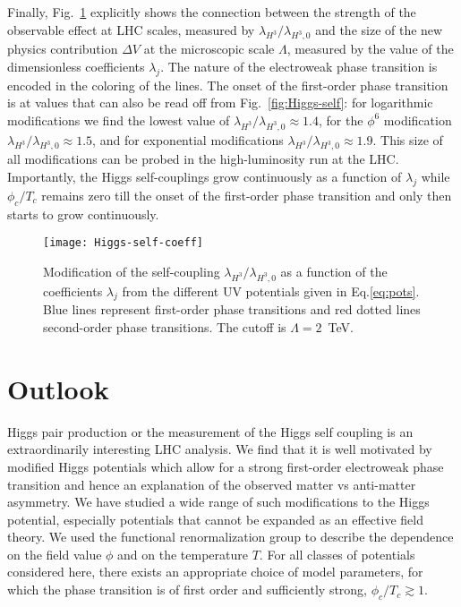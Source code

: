 \documentclass[aps,prd,11pt,tightenlines,superscriptaddress,nofootinbib,preprintnumbers,notitlepage]{revtex4-1}
\begin{document}
Finally, Fig.~\ref{fig:Higgs-self-coeff} explicitly shows the connection
between the strength of the observable effect at LHC scales, measured
by $\lambda_{H^3}/\lambda_{H^3,0}$ and the size of the new physics
contribution $\Delta V$ at the microscopic scale $\Lambda$, measured
by the value of the dimensionless coefficients $\lambda_j$. The nature
of the electroweak phase transition is encoded in the coloring of the lines.
The onset of the first-order phase transition is at values that can 
also be read off from Fig.~\ref{fig:Higgs-self}: for logarithmic modifications
we find the lowest value of $\lambda_{H^3}/\lambda_{H^3,0} \approx 1.4$,
for the $\phi^6$ modification $\lambda_{H^3}/\lambda_{H^3,0} \approx 1.5$,
and for exponential modifications $\lambda_{H^3}/\lambda_{H^3,0} \approx 1.9$.
This size of all modifications can be probed in the high-luminosity run at the LHC.
Importantly, the Higgs self-couplings grow continuously as a function of $\lambda_j$
while $\phi_c/T_c$ remains zero till the onset of the first-order phase transition
and only then starts to grow continuously.

\begin{figure}[!t]
 \texttt{[image: Higgs-self-coeff]}
 \caption{Modification of the self-coupling
   $\lambda_{H^3}/\lambda_{H^3,0}$ as a function of the
   coefficients $\lambda_j$ from the different UV potentials given in
   Eq.\eqref{eq:pots}.  Blue lines represent first-order phase
   transitions and red dotted lines second-order phase transitions. The cutoff
   is $\Lambda = 2$~TeV.}
 \label{fig:Higgs-self-coeff}
\end{figure}



\section{Outlook}
\label{sec:outlook}

Higgs pair production or the measurement of the Higgs self coupling is
an extraordinarily interesting LHC analysis. We find that it is well
motivated by modified Higgs potentials which allow for a strong
first-order electroweak phase transition and hence an explanation of
the observed matter vs anti-matter asymmetry. 
We have studied a wide range of such modifications to
the Higgs potential,
especially potentials that cannot be
expanded as an effective field theory. We used the functional
renormalization group to describe the dependence on the field value
$\phi$ and on the temperature $T$. For all classes of potentials considered
here, there exists an appropriate choice of model parameters, for which 
the phase transition is of first order and sufficiently strong, 
$\phi_c/T_c \gtrsim 1$.\medskip
\end{document}
